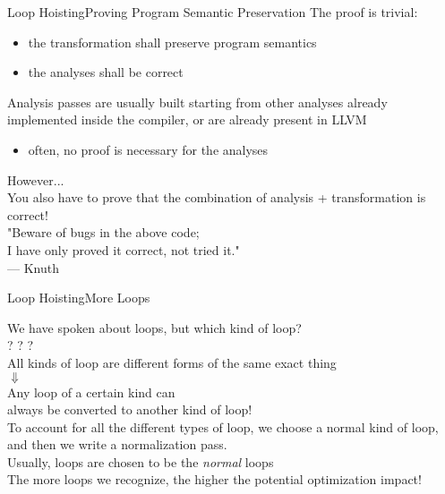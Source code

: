 \begin{frame}{Loop Hoisting}{Proving Program Semantic Preservation}
The \alert{proof} is trivial:

\begin{itemize}
\item the transformation shall preserve program semantics
\item the analyses shall be correct
\end{itemize}

Analysis passes are usually built starting from other analyses already
implemented inside the compiler, or are already present in LLVM
\begin{itemize}
\item often, no proof is necessary for the analyses
\end{itemize}

\vfill
\begin{center}
\alert{However...}\\
\smallskip
You also have to prove that the combination of analysis + transformation is correct!\\
\smallskip
"Beware of bugs in the above code;\\I have only proved it correct, not tried it."\\--- Knuth
\end{center}
\end{frame}


\begin{frame}{Loop Hoisting}{More Loops}
\begin{center} 
We have spoken about loops, but which kind of loop?\\
\medskip
{}? ? ?\\

\bigskip
All kinds of loop are different forms of the \alert{same exact thing}\\
$\Downarrow$\\
Any loop of a certain kind can\\always be converted to another kind of loop!\\

\bigskip
To account for all the different types of loop, we choose a \alert{normal}
kind of loop, and then we write a \alert{normalization} pass.\\
{\footnotesize Usually,  loops are chosen to be the \emph{normal} loops}\\

\bigskip
The more loops we recognize, the higher the potential
\alert{optimization impact}!
\end{center}
\end{frame}


